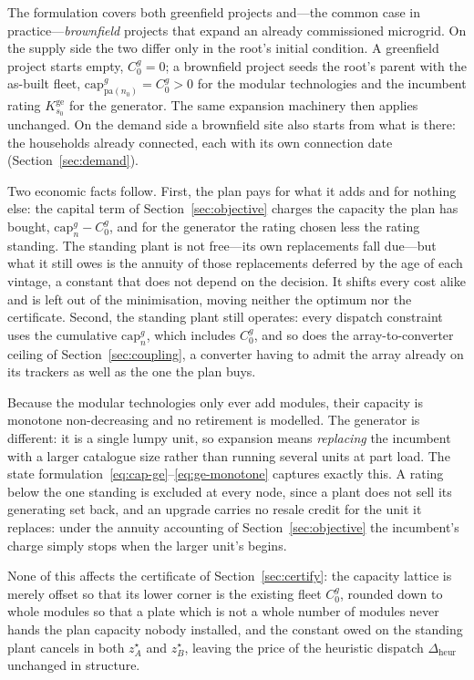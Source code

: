 \documentclass[11pt,a4paper]{article}
\theoremstyle{plain}
\theoremstyle{definition}
\newcommand{\pa}{\mathrm{pa}}
\begin{document}
The formulation covers both greenfield projects and---the common case in
practice---\emph{brownfield} projects that expand an already commissioned microgrid. On
the supply side the two differ only in the root's initial condition. A greenfield project
starts empty, $C^{g}_0=0$; a brownfield project seeds the root's parent with the as-built
fleet, $\mathrm{cap}^{g}_{\pa(n_0)}=C^{g}_0>0$ for the modular technologies and the
incumbent rating $K^{\mathrm{ge}}_{s_0}$ for the generator. The same expansion machinery
then applies unchanged. On the demand side a brownfield site also starts from what is
there: the households already connected, each with its own connection date
(Section~\ref{sec:demand}).

Two economic facts follow. First, the plan pays for what it adds and for nothing else: the
capital term of Section~\ref{sec:objective} charges the capacity the plan has bought,
$\mathrm{cap}^{g}_n-C^{g}_0$, and for the generator the rating chosen less the rating
standing. The standing plant is not free---its own replacements fall due---but what it
still owes is the annuity of those replacements deferred by the age of each vintage, a
constant that does not depend on the decision. It shifts every cost alike and is left out
of the minimisation, moving neither the optimum nor the certificate. Second, the standing
plant still operates: every dispatch constraint uses the cumulative
$\mathrm{cap}^{g}_n$, which includes $C^{g}_0$, and so does the array-to-converter ceiling
of Section~\ref{sec:coupling}, a converter having to admit the array already on its
trackers as well as the one the plan buys.

Because the modular technologies only ever add modules, their capacity is monotone
non-decreasing and no retirement is modelled. The generator is different: it is a single
lumpy unit, so expansion means \emph{replacing} the incumbent with a larger catalogue size
rather than running several units at part load. The state
formulation~\eqref{eq:cap-ge}--\eqref{eq:ge-monotone} captures exactly this. A rating
below the one standing is excluded at every node, since a plant does not sell its
generating set back, and an upgrade carries no resale credit for the unit it replaces:
under the annuity accounting of Section~\ref{sec:objective} the incumbent's charge simply
stops when the larger unit's begins.

None of this affects the certificate of Section~\ref{sec:certify}: the capacity lattice is
merely offset so that its lower corner is the existing fleet $C^{g}_0$, rounded down to
whole modules so that a plate which is not a whole number of modules never hands the plan
capacity nobody installed, and the constant owed on the standing plant cancels in both
$z_A^\star$ and $z_B^\star$, leaving the price of the heuristic dispatch
$\Delta_{\mathrm{heur}}$ unchanged in structure.
\end{document}
